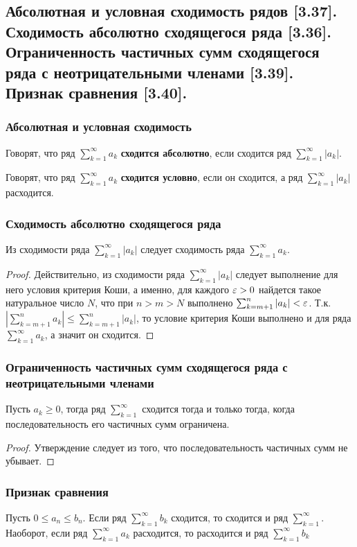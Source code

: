 \documentclass[12pt, a4paper]{article}
\begin{document}
    \subsection{Абсолютная и условная сходимость рядов [3.37]. Сходимость абсолютно сходящегося ряда [3.36]. Ограниченность частичных сумм сходящегося ряда с неотрицательными членами [3.39]. Признак сравнения [3.40].}
    \subsubsection{Абсолютная и условная сходимость}
    Говорят, что ряд $\sum_{k=1}^{\infty} a_k$ \textbf{сходится абсолютно}, если сходится ряд $\sum_{k=1}^{\infty} |a_k|$.

    Говорят, что ряд $\sum_{k=1}^{\infty} a_k$ \textbf{сходится условно}, если он сходится, а ряд $\sum_{k=1}^{\infty} |a_k|$ расходится.
    \subsubsection{Сходимость абсолютно сходящегося ряда}
    Из сходимости ряда $\sum_{k=1}^{\infty} |a_k|$ следует сходимость ряда $\sum_{k=1}^{\infty} a_k$.
    \begin{proof}
        Действительно, из сходимости ряда $\sum_{k=1}^{\infty} |a_k|$ следует выполнение для него условия критерия Коши, а именно, для каждого $\varepsilon > 0$ найдется такое натуральное число $N$, что при $n > m > N$ выполнено $\sum_{k=m+1}^{n} |a_k| < \varepsilon$. Т.к. $\left|\sum_{k=m+1}^{n} a_k\right| \leq \sum_{k=m+1}^{n} |a_k|$, то условие критерия Коши выполнено и для ряда $\sum_{k=1}^{\infty} a_k$, а значит он сходится.
    \end{proof}
    \subsubsection{Ограниченность частичных сумм сходящегося ряда с неотрицательными членами}
    Пусть $a_k \geq 0$, тогда ряд $\sum_{k=1}^{\infty}$ сходится тогда и только тогда, когда последовательность его частичных сумм ограничена. 
    \begin{proof}
    Утверждение следует из того, что последовательность частичных сумм не убывает.
    \end{proof}
    \subsubsection{Признак сравнения}
    Пусть $0 \leq a_n \leq b_n$. Если ряд $\sum_{k=1}^{\infty} b_k$ сходится, то сходится и ряд $\sum_{k=1}^{\infty}$. Наоборот, если ряд $\sum_{k=1}^{\infty} a_k$ расходится, то расходится и ряд $\sum_{k=1}^{\infty} b_k$
\end{document}
